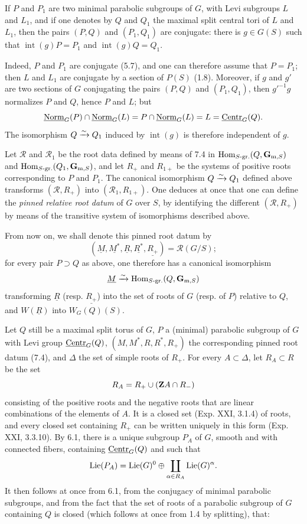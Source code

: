 \label{XXVI.7.5}
If $P$ and $P_1$ are two minimal parabolic subgroups of $G$, with Levi subgroups $L$ and $L_1$, and if one denotes by $Q$ and $Q_1$ the maximal split central tori of $L$ and $L_1$, then the pairs $(P,Q)$ and $(P_1,Q_1)$ are conjugate: there is $g\in G(S)$ such that $\operatorname{int}(g)P=P_1$ and $\operatorname{int}(g)Q=Q_1$.

Indeed, $P$ and $P_1$ are conjugate (5.7), and one can therefore assume that $P=P_1$; then $L$ and $L_1$ are conjugate by a section of $P(S)$ (1.8). Moreover, if $g$ and $g'$ are two sections of $G$ conjugating the pairs $(P,Q)$ and $(P_1,Q_1)$, then $g'^{-1}g$ normalizes $P$ and $Q$, hence $P$ and $L$; but
\[
 \underline{\mathrm{Norm}}_G(P)\cap\underline{\mathrm{Norm}}_G(L)=P\cap\underline{\mathrm{Norm}}_G(L)=L=\underline{\mathrm{Centr}}_G(Q).
\]
The isomorphism $Q\xrightarrow{\sim} Q_1$ induced by $\operatorname{int}(g)$ is therefore independent of $g$.

Let $\mathscr R$ and $\mathscr R_1$ be the root data defined by means of 7.4 in $\operatorname{Hom}_{S\text{-gr.}}(Q,\mathbf G_{\mathrm m,S})$ and $\operatorname{Hom}_{S\text{-gr.}}(Q_1,\mathbf G_{\mathrm m,S})$, and let $R_+$ and $R_{1+}$ be the systems of positive roots corresponding to $P$ and $P_1$. The canonical isomorphism $Q\xrightarrow{\sim} Q_1$ defined above transforms $(\mathscr R,R_+)$ into $(\mathscr R_1,R_{1+})$. One deduces at once that one can define the \emph{pinned relative root datum} of $G$ over $S$, by identifying the different $(\mathscr R,R_+)$ by means of the transitive system of isomorphisms described above.

From now on, we shall denote this pinned root datum by
\[
 (\underline M,\underline{M^*},\underline R,\underline{R^*},\underline{R_+})=\mathscr R(G/S);
\]
for every pair $P\supset Q$ as above, one therefore has a canonical isomorphism
\[
 \underline M\xrightarrow{\sim}\operatorname{Hom}_{S\text{-gr.}}(Q,\mathbf G_{\mathrm m,S})
\]
transforming $\underline R$ (resp. $\underline{R_+}$) into the set of roots of $G$ (resp. of $P$) relative to $Q$, and $W(\underline R)$ into $W_G(Q)(S)$.

\label{XXVI.7.6}
Let $Q$ still be a maximal split torus of $G$, $P$ a (minimal) parabolic subgroup of $G$ with Levi group $\underline{\mathrm{Centr}}_G(Q)$, $(M,M^*,R,R^*,R_+)$ the corresponding pinned root datum (7.4), and $\Delta$ the set of simple roots of $R_+$. For every $A\subset\Delta$, let $R_A\subset R$ be the set
\[
 R_A=R_+\cup(\mathbf{Z} A\cap R_-)
\]
consisting of the positive roots and the negative roots that are linear combinations of the elements of $A$. It is a closed set (Exp. XXI, 3.1.4) of roots, and every closed set containing $R_+$ can be written uniquely in this form (Exp. XXI, 3.3.10). By 6.1, there is a unique subgroup $P_A$ of $G$, smooth and with connected fibers, containing $\underline{\mathrm{Centr}}_G(Q)$ and such that
\[
 \operatorname{Lie}(P_A)=\operatorname{Lie}(G)^0\oplus\coprod_{\alpha\in R_A}\operatorname{Lie}(G)^\alpha.
\]
It then follows at once from 6.1, from the conjugacy of minimal parabolic subgroups, and from the fact that the set of roots of a parabolic subgroup of $G$ containing $Q$ is closed (which follows at once from 1.4 by splitting), that:

